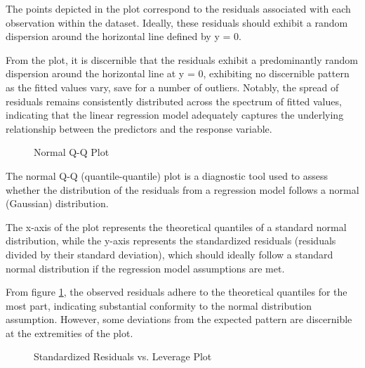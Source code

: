 \documentclass[conference]{IEEEtran}
\begin{document}
\vspace{0.5cm}

The points depicted in the plot correspond to the residuals associated with each observation within the dataset. Ideally, these residuals should exhibit a random dispersion around the horizontal line defined by y = 0.

From the plot, it is discernible that the residuals exhibit a predominantly random dispersion around the horizontal line at y = 0, exhibiting no discernible pattern as the fitted values vary, save for a  number of outliers. Notably, the spread of residuals remains consistently distributed across the spectrum of fitted values, indicating that the linear regression model adequately captures the underlying relationship between the predictors and the response variable.

\vspace{0.5cm}

\begin{figure}[!h]
      \centering
       {}
      \caption{Normal Q-Q Plot}
      \label{fig:mlr_qq}
\end{figure}

\vspace{0.5cm}

The normal Q-Q (quantile-quantile) plot is a diagnostic tool used to assess whether the distribution of the residuals from a regression model follows a normal (Gaussian) distribution.

The x-axis of the plot represents the theoretical quantiles of a standard normal distribution, while the y-axis represents the standardized residuals (residuals divided by their standard deviation), which should ideally follow a standard normal distribution if the regression model assumptions are met.

From figure \ref{fig:mlr_qq}, the observed residuals adhere to the theoretical quantiles for the most part, indicating substantial conformity to the normal distribution assumption. However, some deviations from the expected pattern are discernible at the extremities of the plot.

\vspace{0.5cm}

\begin{figure}[!h]
      \centering
       {}
      \caption{Standardized Residuals vs. Leverage Plot}
      \label{fig:stdres_leverage}
\end{figure}
\end{document}
